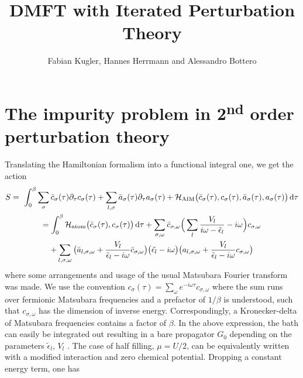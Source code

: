 \documentclass[11pt]{article}
\title{DMFT with Iterated Perturbation Theory}
\author{Fabian Kugler, Hannes Herrmann and Alessandro Bottero}
\begin{document}
\maketitle


\section{The impurity problem in 2\textsuperscript{nd} order perturbation theory}
\label{sec_impsolv}

Translating the Hamiltonian formalism into a functional integral one, we get the action
%
\begin{gather*}
S = \
	\int_0^{\beta} \sum_{\sigma} \bar{c}_{\sigma} (\tau) \partial_{\tau} c_{\sigma} (\tau) 
	+ \sum_{l, \sigma} \bar{a}_{\sigma} (\tau) \partial_{\tau} a_{\sigma} (\tau)
	+ \mathcal{H}_{\text{AIM}} \big( \bar{c}_{\sigma} (\tau), c_{\sigma} (\tau), \bar{a}_{\sigma} (\tau), a_{\sigma} (\tau) \big)
	\dif \tau
	\\
	 = \int_0^{\beta}  \mathcal{H}_{\text{atom}} \big( \bar{c}_{\sigma} (\tau), c_{\sigma} (\tau) \big)  \dif \tau 
	+ \sum_{\sigma, \omega} \bar{c}_{\sigma, \omega} 
	\Big( \sum_{l} \frac{V_l}{i\omega - \tilde{\epsilon}_l} - i\omega \Big)
	c_{\sigma, \omega} 
	\\
	+ \sum_{l, \sigma, \omega} \big( \bar{a}_{l, \sigma, \omega} + \frac{V_l}{\tilde{\epsilon}_l - i\omega} \bar{c}_{\sigma, \omega} \big) 
	\big( \tilde{\epsilon_l} - i\omega \big)
	\big( a_{l, \sigma, \omega} + \frac{V_l}{\tilde{\epsilon}_l - i\omega} c_{\sigma, \omega} \big) 
\end{gather*}
%
where some arrangements and usage of the usual Matsubara Fourier transform was made. We use the convention
$
c_{\sigma} (\tau) = \sum_{\omega} e^{-i\omega \tau} c_{\sigma, \omega}
$
where the sum runs over fermionic Matsubara frequencies and a prefactor of $1/ \beta$ is understood, such that $c_{\sigma, \omega}$ has the dimension of inverse energy. Correspondingly, a Kronecker-delta of Matsubara frequencies contains a factor of $\beta$. In the above expression, the bath can easily be integrated out resulting in a bare propagator $G_0$ depending on the parameters $\tilde{\epsilon}_l$, $V_l$ . The case of half filling, $\mu = U/2$, can be equivalently written with a modified interaction and zero chemical potential. Dropping a constant energy term, one has
\end{document}
